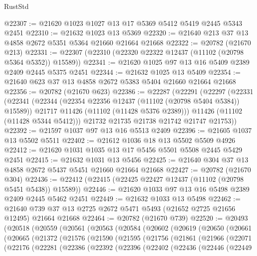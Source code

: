 \begin{lexlean}{RustStd}
\begin{coremodule}
@22307 := @21620 @1023 @1027 @13 @17 @5369 @5412 @5419 @2445 @5343 @2451
@22310 := @21632 @1023 @13 @5369
@22320 := @21640 @213 @37 @13 @4858 @2672 @5351 @5364 @21660 @21664 @21668
@22322 := @20782 (@21670 @213)
@22331 := @22307 (@22310 (@22320 @22322 @12437 (@11102 (@20798 @5364 @5352)) @15589))
@22341 := @21620 @1025 @97 @13 @16 @5409 @2389 @2409 @2445 @5375 @2451
@22344 := @21632 @1025 @13 @5409
@22354 := @21640 @623 @37 @13 @4858 @2672 @5383 @5404 @21660 @21664 @21668
@22356 := @20782 (@21670 @623)
@22386 := @22287
    (@22291
      (@22297
        (@22331
          (@22341
            (@22344 (@22354 @22356 @12437 (@11102 (@20798 @5404 @5384)) @15589))
            @21717
            @11426
            (@11102 (@11428 @5376 @2389)))
          @11426
          (@11102 (@11428 @5344 @5412)))
        @21732
        @21735
        @21738
        @21742
        @21747
        @21753))
@22392 := @21597 @1037 @97 @13 @16 @5513 @2409
@22396 := @21605 @1037 @13 @5502 @5511
@22402 := @21612 @1036 @18 @13 @5502 @5509 @4926
@22412 := @21620 @1031 @1035 @13 @17 @5456 @5501 @5508 @2445 @5429 @2451
@22415 := @21632 @1031 @13 @5456
@22425 := @21640 @304 @37 @13 @4858 @2672 @5437 @5451 @21660 @21664 @21668
@22427 := @20782 (@21670 @304)
@22436 := @22412 (@22415 (@22425 @22427 @12437 (@11102 (@20798 @5451 @5438)) @15589))
@22446 := @21620 @1033 @97 @13 @16 @5498 @2389 @2409 @2445 @5462 @2451
@22449 := @21632 @1033 @13 @5498
@22462 := @21640 @739 @37 @13 @2725 @2672 @5471 @5493 (@21652 @2725 @21656 @12495) @21664 @21668
@22464 := @20782 (@21670 @739)
@22520 := @20493
    (@20518
      (@20559
        (@20561
          (@20563
            (@20584
              (@20602
                (@20619
                  (@20650
                    (@20661
                      (@20665
                        (@21372
                          (@21576
                            (@21590
                              (@21595
                                (@21756
                                  (@21861
                                    (@21966
                                      (@22071
                                        (@22176
                                          (@22281
                                            (@22386
                                              (@22392
                                                (@22396
                                                  (@22402
                                                    (@22436
                                                      (@22446
                                                        (@22449

\end{coremodule}
\end{lexlean}
